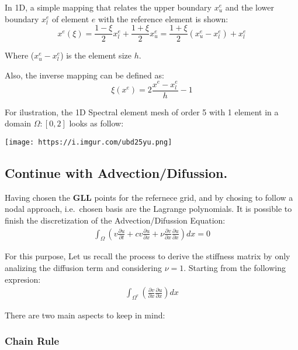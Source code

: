 \documentclass[
  a4paper,
  10pt]{article}
\begin{document}
In 1D, a simple mapping that relates the upper boundary \(x^{e}_u\) and
the lower boundary \(x^{e}_l\) of element \(e\) with the reference
element is shown: \begin{equation}
    x^{e}(\xi) = \frac{1-\xi}{2}x^{e}_l+ \frac{1+\xi}{2}x^{e}_u = \frac{1+\xi}{2}(x^{e}_u-x^{e}_l)+x^{e}_l
\end{equation}

Where (\(x^{e}_u-x^{e}_l\)) is the element size \(h\).

Also, the inverse mapping can be defined as: \begin{equation}
    \xi(x^{e}) = 2\frac{x^{e}-x^{e}_l}{h}-1 
\end{equation}

For ilustration, the 1D Spectral element mesh of order 5 with 1 element
in a domain \(\Omega:[0,2]\) looks as follow:

\texttt{[image: https://i.imgur.com/ubd25yu.png]}

\hypertarget{continue-with-advectiondifussion.}{%
\subsection{Continue with
Advection/Difussion.}\label{continue-with-advectiondifussion.}}

Having chosen the \textbf{GLL} points for the refernece grid, and by
chosing to follow a nodal approach, i.e.~chosen basis are the Lagrange
polynomials. It is possible to finish the discretization of the
Advection/Difussion Equation: \begin{align}
\int_{\Omega} (v\frac{\partial u}{\partial t} + cv\frac{\partial u}{\partial x} + \nu\frac{\partial v}{\partial x}\frac{\partial u}{\partial x})dx = 0
\end{align}

For this purpose, Let us recall the process to derive the stiffness
matrix by only analizing the diffusion term and considering \(\nu=1\).
Starting from the following expresion: \begin{align}
\int_{\Omega^{e}} ( \frac{\partial v}{\partial x}\frac{\partial u}{\partial x})dx
\end{align}

There are two main aspects to keep in mind:

\hypertarget{chain-rule}{%
\subsubsection{Chain Rule}\label{chain-rule}}
\end{document}
